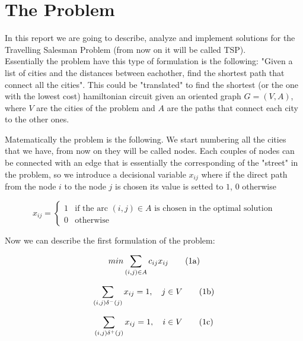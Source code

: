 \section{\centering The Problem}
\label{sec:intro}

In this report we are going to describe, analyze and implement solutions for the Travelling Salesman Problem (from now on it will be called TSP).\\
Essentially the problem have this type of formulation is the following: "Given a list of cities and the distances between eachother, find the shortest path that connect all the cities".
This could be "translated" to find the shortest (or the one with the lowest cost) hamiltonian circuit given an oriented graph $G=(V, A)$, where $V$ are the cities of the problem and $A$ are the paths that connect each city to the other ones.

Matematically the problem is the following.  We start numbering all the cities that we have, from now on they will be called nodes. Each couples of nodes can be connected with an edge that is essentially the corresponding of the "street" in the problem, so we introduce a decisional variable $x_{ij}$ where if the direct path from the node $i$ to the node $j$ is chosen its value is setted to $1$, $0$ otherwise

\begin{equation}
	x_{ij}=
	\begin{cases}
		1 & \text{if the arc $(i, j) \in A$ is chosen in the optimal solution}\\
		0 & \text{otherwise}
	\end{cases}
\end{equation}

Now we can describe the first formulation of the problem:

\begin{equation}
	\label{eqn:cost}
	min\sum_{(i,j)\in A}c_{ij}x_{ij}
	\stepcounter{equation}\tag{{\theequation}a}
\end{equation}

\begin{equation}
	\label{eqn:in}
	\sum_{(i,j)\delta^-(j)}x_{ij}=1, \quad j\in V
	\tag{{\theequation}b}
\end{equation}

\begin{equation}
	\label{eqn:out}
	\sum_{(i,j)\delta^+(j)}x_{ij}=1, \quad i\in V
	\tag{{\theequation}c}
\end{equation}


